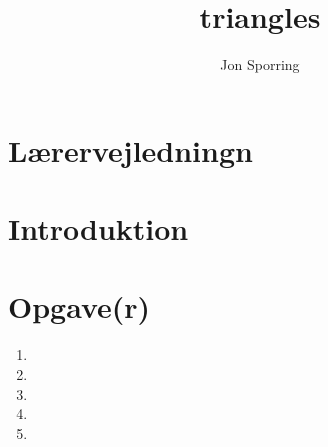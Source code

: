 \documentclass[a4paper,12pt]{article}
\title{triangles}
\author{Jon Sporring}
\begin{document}
\maketitle

\section{Lærervejledningn}

\section{Introduktion}

\section{Opgave(r)}
\begin{enumerate}
\item 
\item 
\item 
\item 
\item 
\end{enumerate}
\end{document}
